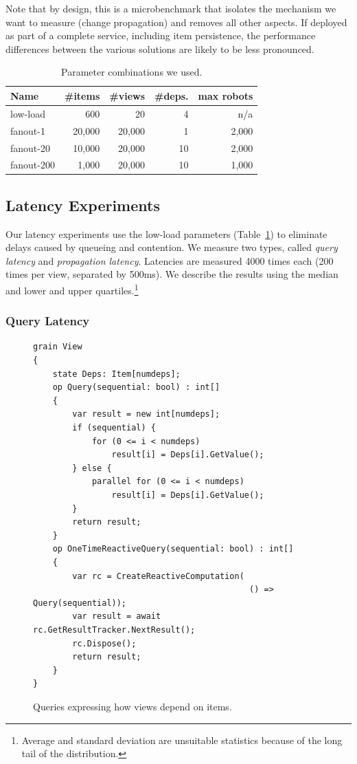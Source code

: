 Note that by design, this is a microbenchmark that isolates the mechanism we want to measure (change propagation) and removes all other aspects. If deployed as part of a complete service, including item persistence, the performance differences between the various solutions are likely to be less pronounced.
 
\begin{table}
\begin{tabularx}{.99\columnwidth}{@{}Xrrrr@{}} \toprule
Name		& \#items 	& \#views & \#deps. & max robots\\ \midrule
low-load	&  600        	& 20       & 4 & n/a \\
fanout-1	& 20,000	& 20,000 & 1& 2,000 \\
fanout-20	& 10,000	& 20,000 & 10 & 2,000\\
fanout-200 & 1,000	& 20,000 & 10& 1,000\\  
\end{tabularx}
\caption{Parameter combinations we used.}\label{tab:param}
\end{table}


\subsection{Latency Experiments}\label{sec:latency}

Our latency experiments use the low-load parameters (Table~\ref{tab:param}) to eliminate delays caused by queueing and contention. We measure two types, called \emph{query latency} and \emph{propagation latency}. Latencies are measured 4000 times each (200 times per view, separated by 500ms). We describe the results using the median and lower and upper quartiles.\footnote{Average and standard deviation are unsuitable statistics because of the long tail of the distribution.}

\subsubsection{Query Latency}

\begin{figure}
\begin{lstlisting}
grain View
{
	state Deps: Item[numdeps]; 
	op Query(sequential: bool) : int[]
	{	
		var result = new int[numdeps];
		if (sequential) {
			for (0 <= i < numdeps)
				result[i] = Deps[i].GetValue();
		} else {
			parallel for (0 <= i < numdeps)
				result[i] = Deps[i].GetValue();
		}
		return result;
	}
	op OneTimeReactiveQuery(sequential: bool) : int[]
	{
	 	var rc = CreateReactiveComputation(
	 										() => Query(sequential));
		var result = await rc.GetResultTracker.NextResult();
		rc.Dispose();
		return result;
	}
}
\end{lstlisting}
\caption{Queries expressing how views depend on items.}\label{fig:queries}
\end{figure}

